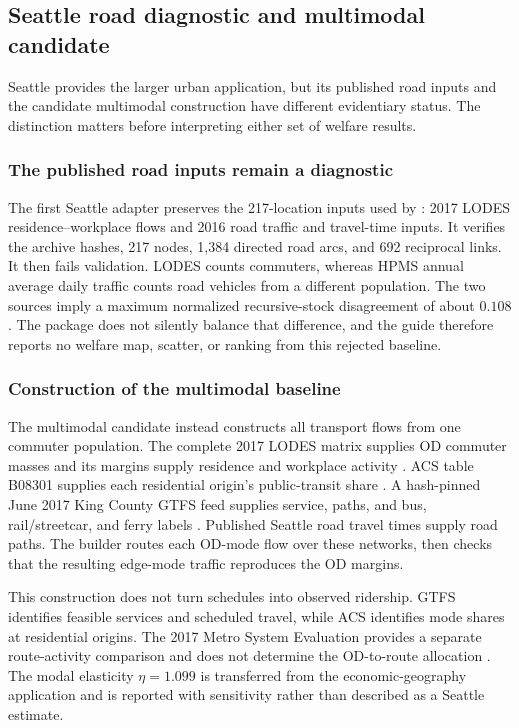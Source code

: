 \subsection{Seattle road diagnostic and multimodal candidate}

Seattle provides the larger urban application, but its published road inputs
and the candidate multimodal construction have different evidentiary status.
The distinction matters before interpreting either set of welfare results.

\subsubsection{The published road inputs remain a diagnostic}

The first Seattle adapter preserves the 217-location inputs used by
\citet{AA_2022restud}: 2017 LODES residence--workplace flows and 2016 road
traffic and travel-time inputs. It verifies the archive hashes, 217 nodes,
1,384 directed road arcs, and 692 reciprocal links. It then fails validation.
LODES counts commuters, whereas HPMS annual average daily traffic counts road
vehicles from a different population. The two sources imply a maximum
normalized recursive-stock disagreement of about \(0.108\). The package does
not silently balance that difference, and the guide therefore reports no
welfare map, scatter, or ranking from this rejected baseline.

\subsubsection{Construction of the multimodal baseline}

The multimodal candidate instead constructs all transport flows from one
commuter population. The complete 2017 LODES matrix supplies OD commuter
masses and its margins supply residence and workplace activity
\citep{CensusLODES}. ACS table B08301 supplies each residential origin's
public-transit share \citep{CensusACS2017B08301}. A hash-pinned June 2017 King
County GTFS feed supplies service, paths, and bus, rail/streetcar, and ferry
labels \citep{KingCountyGTFS2017}. Published Seattle road travel times supply
road paths. The builder routes each OD-mode flow over these networks, then
checks that the resulting edge-mode traffic reproduces the OD margins.

This construction does not turn schedules into observed ridership. GTFS
identifies feasible services and scheduled travel, while ACS identifies mode
shares at residential origins. The 2017 Metro System Evaluation provides a
separate route-activity comparison and does not determine the OD-to-route
allocation \citep{KingCountyMetro2017Evaluation}. The modal elasticity
\(\eta=1.099\) is transferred from the economic-geography application and is
reported with sensitivity rather than described as a Seattle estimate.

